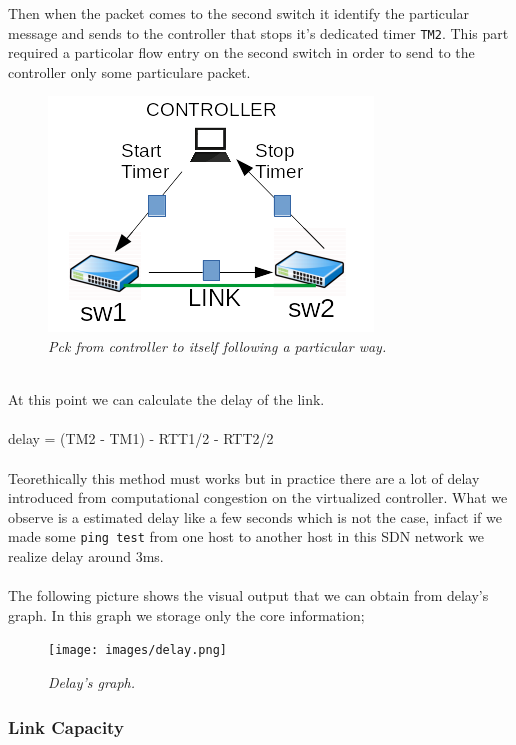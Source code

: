 \documentclass[article,10pt]{IEEEtran}
\begin{document}
Then when the packet comes to the second switch it identify the particular message and sends to the controller that stops it's dedicated timer \texttt{TM2}.
\newline This part required a particolar flow entry on the second switch in order to send to the controller only some particulare packet.
\begin{figure}[!h]
 \centering
 \includegraphics[scale=0.70]{images/rtt1.png}
 \caption{\emph{Pck from controller to itself following a particular way.}}
 \label{fig:topo}
\end{figure}
\\
\newline At this point we can calculate the delay of the link.
\\
\\
 delay = (TM2 - TM1) - RTT1/2 - RTT2/2
\\
\\
Teorethically this method must works but in practice there are a lot of delay introduced from computational congestion on the virtualized controller.
What we observe is a estimated delay like a few seconds which is not the case, infact if we made some \texttt{ping test} from one host to another host
in this SDN network we realize delay around 3ms.
\\
\\
The following picture shows the visual output that we can obtain from delay's graph. In this graph we storage only the core information;
\begin{figure}[!h]
 \centering
 \texttt{[image: images/delay.png]}
 \caption{\emph{Delay's graph.}}
 \label{fig:topo}
\end{figure}


		\subsubsection{Link Capacity}
\end{document}
